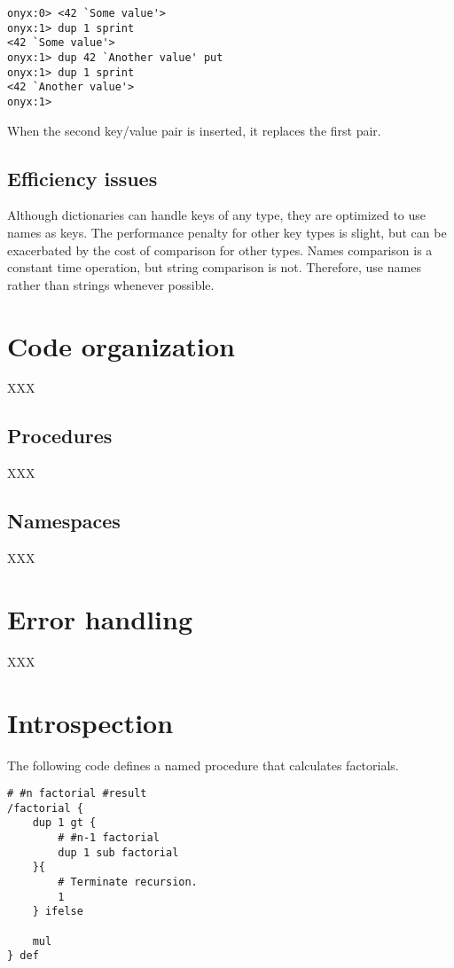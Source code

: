 \begin{verbatim}
onyx:0> <42 `Some value'>
onyx:1> dup 1 sprint
<42 `Some value'>
onyx:1> dup 42 `Another value' put
onyx:1> dup 1 sprint
<42 `Another value'>
onyx:1>
\end{verbatim}

When the second key/value pair is inserted, it replaces the first pair.

\subsection{Efficiency issues}

Although dictionaries can handle keys of any type, they are optimized to use
names as keys.  The performance penalty for other key types is slight, but can
be exacerbated by the cost of comparison for other types.  Names comparison is a
constant time operation, but string comparison is not.  Therefore, use names
rather than strings whenever possible.

\section{Code organization}
XXX
\subsection{Procedures}
XXX
\subsection{Namespaces}
XXX

\section{Error handling}
XXX

\section{Introspection}
\label{onyxtut:introspection}

The following code defines a named procedure that calculates factorials.

\begin{verbatim}
# #n factorial #result
/factorial {
    dup 1 gt {
        # #n-1 factorial
        dup 1 sub factorial
    }{
        # Terminate recursion.
        1
    } ifelse

    mul
} def
\end{verbatim}

